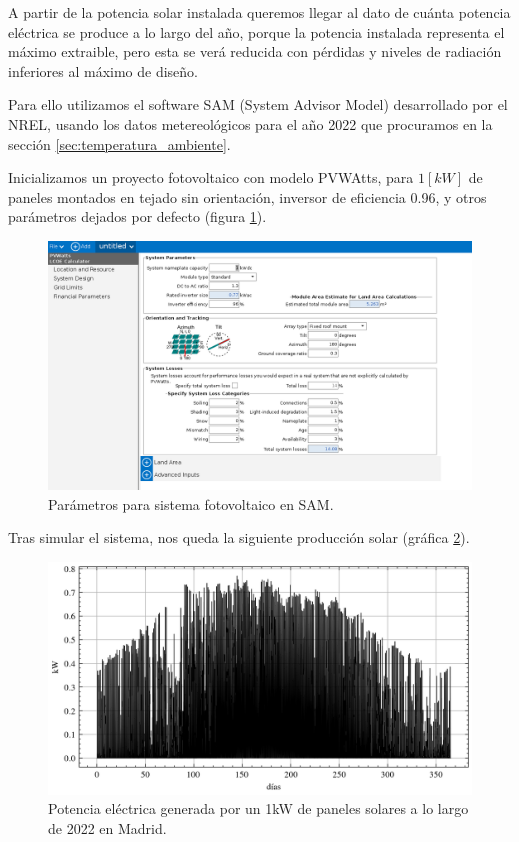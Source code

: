 A partir de la potencia solar instalada queremos llegar al dato de cuánta
potencia eléctrica se produce a lo largo del año, porque la potencia instalada
representa el máximo extraible, pero esta se verá reducida con pérdidas y
niveles de radiación inferiores al máximo de diseño.

Para ello utilizamos el software SAM \cite{SAM2023} (System Advisor Model)
desarrollado por el NREL, usando los datos metereológicos para el año 2022 que
procuramos en la sección \ref{sec:temperatura_ambiente}.

Inicializamos un proyecto fotovoltaico con modelo PVWAtts, para $1[kW]$ de
paneles montados en tejado sin orientación, inversor de eficiencia 0.96, y
otros parámetros dejados por defecto (figura \ref{fig:sam_solar_parameters}).

\begin{figure}[h] \centering
	\centering
	\includegraphics[width=1\textwidth]{./capitulos/adquisicion_de_datos/images/sam_solar_parameters.png}
	\caption{Parámetros para sistema fotovoltaico en SAM.}
	\label{fig:sam_solar_parameters}
\end{figure}

Tras simular el sistema, nos queda la siguiente producción solar (gráfica
\ref{fig:solar_production}).

\begin{figure}[h] \centering
	\centering
	\includegraphics[width=1\textwidth]{./capitulos/adquisicion_de_datos/images/solar_production.png}
	\caption{Potencia eléctrica generada por un 1kW de paneles solares a lo largo
		de 2022 en Madrid.}
	\label{fig:solar_production}
\end{figure}
